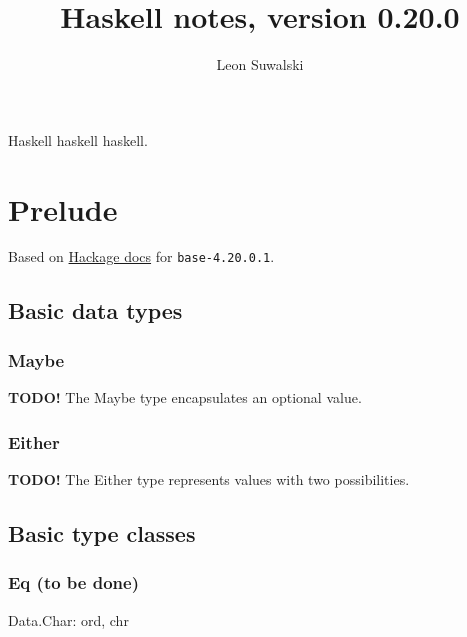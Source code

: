 \documentclass{charun}
\title{Haskell notes, version 0.20.0}
\author{Leon Suwalski}
\begin{document}
\begin{multicols*}{3}
\maketitle
\raggedright
Haskell haskell haskell.
\section{Prelude}
Based on \href{https://hackage.haskell.org/package/base-4.20.0.1/docs/Prelude.html}{Hackage docs} for \texttt{base-4.20.0.1}.

\subsection{Basic data types}




\subsubsection{Maybe}
\textbf{TODO!}
The Maybe type encapsulates an optional value.

\subsubsection{Either}
\textbf{TODO!}
The Either type represents values with two possibilities.





\subsection{Basic type classes}

\subsubsection{Eq (to be done)}












\newpage








Data.Char: ord, chr


\end{multicols*}
\end{document}
